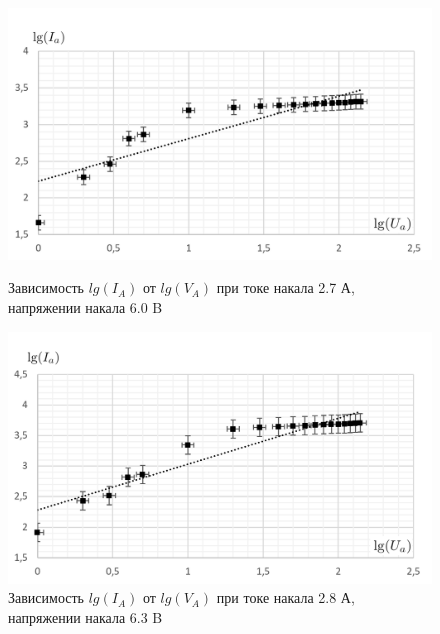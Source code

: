 \documentclass[a4paper]{article}
\begin{document}
\begin{figure}[h]
\begin{center}
\begin{minipage}[h]{0.45\linewidth}
\includegraphics[width=1\linewidth]{2_7.png}
\caption{Зависимость $lg(I_A)$ от $lg(V_A)$ при токе накала 2.7 А, напряжении накала 6.0 B}
\end{minipage}
\hfill 
\begin{minipage}[h]{0.45\linewidth}
\includegraphics[width=1\linewidth]{2_8.png}
\caption{Зависимость $lg(I_A)$ от $lg(V_A)$ при токе накала 2.8 А, напряжении накала 6.3 B }
\end{minipage}
\end{center}
\end{figure}
\end{document}
